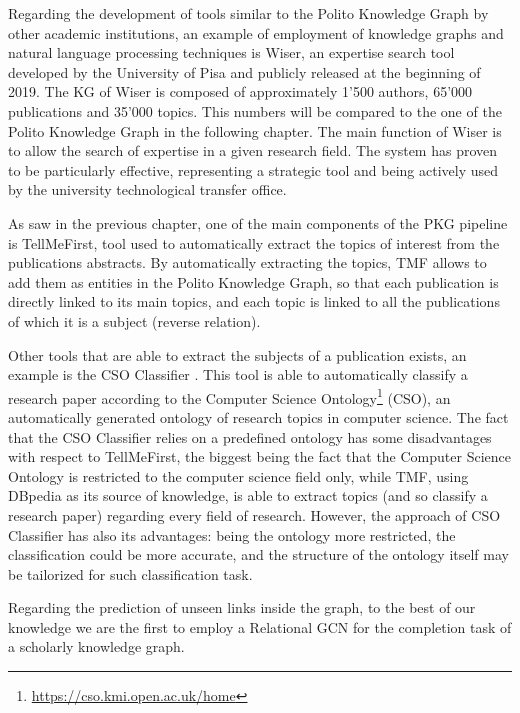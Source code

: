 \documentclass[%
    corpo=13.5pt,
    twoside,
    oldstyle,
    tipotesi=magistrale,
    greek,
    evenboxes
]{toptesi}
\begin{document}
Regarding the development of tools similar to the Polito Knowledge Graph
by other academic institutions, an example of employment of knowledge graphs
and natural language processing techniques is Wiser\cite{cifariello2019}, an
expertise search tool developed by the University of Pisa and publicly released
at the beginning of 2019.
The KG of Wiser is composed of approximately 1'500 authors, 65'000 publications
and 35'000 topics. This numbers will be compared to the one of the Polito
Knowledge Graph in the following chapter.
The main function of Wiser is to allow the search of expertise in a given
research field.
The system has proven to be particularly effective, representing a strategic
tool and being actively used by the university technological transfer office.
\newline

As saw in the previous chapter, one of the main components of the PKG
pipeline is TellMeFirst, tool used to automatically extract the topics of
interest from the publications abstracts. By automatically extracting the
topics, TMF allows to add them as entities in the Polito Knowledge Graph,
so that each publication is directly linked to its main topics, and each topic
is linked to all the publications of which it is a subject (reverse relation).

Other tools that are able to extract the subjects of a publication exists, an
example is the CSO Classifier \cite{salatino2019}. This tool is able to
automatically classify a research paper according to the Computer Science
Ontology\footnote{\url{https://cso.kmi.open.ac.uk/home}} (CSO), an automatically
generated ontology of research topics in computer science.
The fact that the CSO Classifier relies on a predefined ontology has some
disadvantages with respect to TellMeFirst, the biggest being the fact that the
Computer Science Ontology is restricted to the computer science field only,
while TMF, using DBpedia as its source of knowledge, is able to extract
topics (and so classify a research paper) regarding every field of research.
However, the approach of CSO Classifier has also its advantages: being the
ontology more restricted, the classification could be more accurate, and the
structure of the ontology itself may be tailorized for such classification task.

Regarding the prediction of unseen links inside the graph, to the best of our
knowledge we are the first to employ a Relational GCN for the completion task
of a scholarly knowledge graph.
\end{document}
